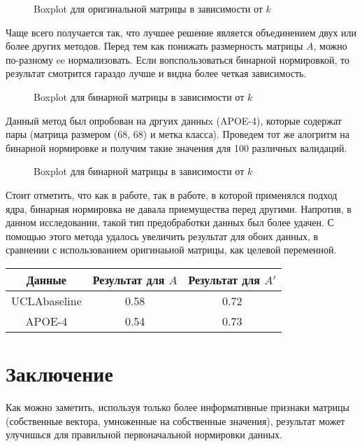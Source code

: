 \documentclass{urticle}
\begin{document}
\begin{figure}[H]
	\caption{Boxplot для оригинальной матрицы в зависимости от $k$}
	\label{f1}
\end{figure}

Чаще всего получается так, что лучшее решение является объединением двух или более других методов. Перед тем как понижать размерность матрицы $A$, можно по-разному ee нормализовать.
Если вопспользоваться бинарной нормировкой, то результат смотрится гараздо лучше и видна более четкая зависимость.
\begin{figure}[H]
	\noindent{}
	\caption{Boxplot для бинарной матрицы в зависимости от $k$}
	\label{f}
\end{figure}

Данный метод был опробован на дргуих данныx (APOE-4), которые содержат пары (матрица размером (68, 68) и метка класса). Проведем тот же алогритм на бинарной нормировке и получим такие значения для 100 различных валидаций.

\begin{figure}[H]
	\noindent{}
	\caption{Boxplot для бинарной матрицы в зависимости от $k$}
	\label{f3}
\end{figure}

Стоит отметить, что как в работе\cite{article1}, так в работе\cite{article2}, в которой применялся подход ядра, бинарная нормировка не давала приемущества перед другими. Напротив, в данном исследовании, такой тип предобработки данных был более удачен. С помощью этого метода удалось увеличить результат для обоих данных, в сравнении с использованием оригинаьной матрицы, как целевой переменной.

\begin{center}
\begin{tabular}[t]{|c|c|c|}
\hline
	Данные & Результат для $A$ & Результат для $A'$ \\
\hline
	UCLAbaseline & 0.58 & 0.72 \\
\hline
	APOE-4 & 0.54 & 0.73 \\
\hline
\end{tabular}
\end{center}

\section*{Заключение}
Как можно заметить, используя только более информативные признаки матрицы (собственные вектора, умноженные на собственные значения), результат может улучишься для правильной первоначальной нормировки данных.
\end{document}

